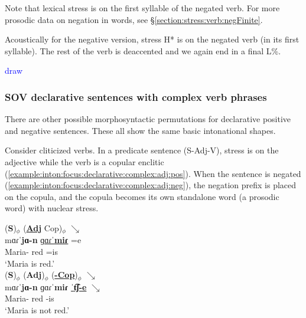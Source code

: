 Note that lexical stress is on the first syllable of the negated verb. For more prosodic data on negation in words, see \S\ref{section:stress:verb:negFinite}. 

Acoustically   for the negative version, stress H* is on the negated verb (in its first syllable). The rest of the verb is deaccented and we again end in a final L\%. 


\textcolor{blue}{draw}


\subsubsection{SOV declarative sentences with complex verb phrases}\label{section:intonation:focus:declarative:complex} 

There are other possible morphosyntactic permutations for declarative positive and negative sentences. These all show the same basic intonational shapes.  

Consider cliticized verbs. In a predicate sentence (S-Adj-V), stress is on the adjective while the verb is a copular enclitic (\ref{example:inton:focus:declarative:complex:adj:pos}). When the sentence is negated (\ref{example:inton:focus:declarative:complex:adj:neg}), the negation prefix is placed on the copula, and the copula becomes its own standalone word (a prosodic word) with nuclear stress. 


\begin{exe}
	\ex \begin{xlist}
		\ex \glll   (\textbf{S})$_\phi$ (\underline{\textbf{Adj}} Cop)$_\phi$ $\searrow$ \\
		mɑɾˈ\textbf{jɑ-n} \underline{ɡɑɾˈ\textbf{miɾ}} =e \\
		Maria-{} red =is   \\
		\trans `Maria is red.' \label{example:inton:focus:declarative:complex:adj:pos}
		\\  
		\ex \glll   (\textbf{S})$_\phi$ (\textbf{Adj})$_\phi$ (\underline{\textbf{{\neggloss}-Cop}})$_\phi$ $\searrow$ \\
		mɑɾˈ\textbf{jɑ-n} {ɡɑɾˈ\textbf{miɾ}} \underline{ˈ\textbf{t͡ʃ-e}} $\searrow$ \\
		Maria-{} red   {\neggloss}-is \\ 
		\trans `Maria is not red.'  \label{example:inton:focus:declarative:complex:adj:neg}
		\\ 
		
	\end{xlist}
\end{exe}

